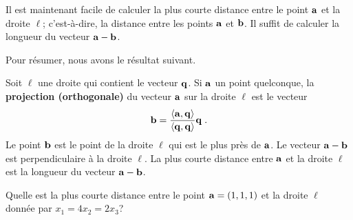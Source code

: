 {Il est maintenant facile de calculer la plus courte distance entre le
point $\mathbf{a}$ et la droite $\ell$; c'est-à-dire, la distance entre
les points $\mathbf{a}$ et $\mathbf{b}$.  Il suffit de calculer la longueur
du vecteur $\mathbf{a}-\mathbf{b}$.


Pour résumer, nous avons le résultat suivant.

\begin{focus}{\dfn} 
Soit $\ell$ une droite qui contient le vecteur $\mathbf{q}$.  Si
$\mathbf{a}$ un point quelconque, la {\bfseries projection (orthogonale)}
du vecteur $\mathbf{a}$ sur la droite $\ell$ est le vecteur
\[
\mathbf{b} =  \frac{\left\langle{\mathbf{a}} , {\mathbf{q}}\right\rangle}{\left\langle{\mathbf{q}} , {\mathbf{q}}\right\rangle} \mathbf{q} \; .
\]
Le point $\mathbf{b}$ est le point de la droite $\ell$ qui est le plus
près de $\mathbf{a}$.  Le vecteur $\mathbf{a}-\mathbf{b}$ est perpendiculaire à
la droite $\ell$.  La plus courte distance entre $\mathbf{a}$ et la droite
$\ell$ est la longueur du vecteur $\mathbf{a}-\mathbf{b}$.
\end{focus}

\begin{egg}
Quelle est la plus courte distance entre le point $\mathbf{a}=(1,1,1)$ et
la droite $\ell$ donnée par $x_1 = 4x_2 = 2x_3$?


\end{egg}}
